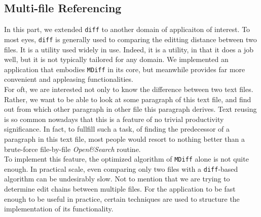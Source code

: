 \documentclass{article}
\begin{document}
\subsection{Multi-file Referencing}
In this part, we extended \texttt{diff} to another domain of applicaiton of interest. To most eyes, \texttt{diff} is generally used to comparing the editting distance between two files. It is a utility used widely in use. Indeed, it is a utility, in that it does a job well, but it is not typically tailored for any domain. We implemented an application that embodies \texttt{MDiff} in its core, but meanwhile provides far more convenient and appleasing functionalities. \\

For oft, we are interested not only to know the difference between two text files. Rather, we want to be able to look at some paragraph of this text file, and find out from which other paragraph in other file this paragraph derives. Text reusing is so common nowadays that this is a feature of no trivial productivity significance. In fact, to fullfill such a task, of finding the predecessor of a paragraph in this text file, most people would resort to nothing better than a brute-force file-by-file \textit{Open\&Search} routine. \\

To implement this feature, the optimized algorithm of \texttt{MDiff} alone is not quite enough. In practical scale, even comparing only two files with a \texttt{diff}-based algorithm can be undesirably slow. Not to mention that we are trying to determine edit chains between multiple files. For the application to be fast enough to be useful in practice, certain techniques are used to structure the implementation of its functionality.\\
\end{document}
